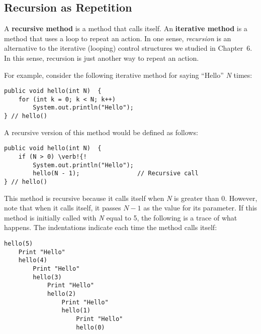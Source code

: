 \subsection{Recursion as Repetition}
\noindent A {\bf recursive method} is a method that calls itself.  An {\bf
iterative method} is a method that uses a loop to repeat an action.  In
one sense, {\it recursion} is an alternative to the iterative
(looping) control structures we studied in
Chapter~6.  In this sense, recursion is just another
way to repeat an action.

For example, consider the following iterative method for
saying ``Hello'' {\it N} times:

\begin{jjjlisting}
\begin{lstlisting}
public void hello(int N)  {
    for (int k = 0; k < N; k++)
        System.out.println("Hello");
} // hello()
\end{lstlisting}
\end{jjjlisting}

\noindent A recursive version of this method would be defined
as follows:

\begin{jjjlisting}
\begin{lstlisting}
public void hello(int N)  {
    if (N > 0) \verb!{!
        System.out.println("Hello");
        hello(N - 1);                // Recursive call
} // hello()
\end{lstlisting}
\end{jjjlisting}

\noindent This method is recursive because it calls itself when {\it
N} is greater than 0. However, note that when it calls itself, it
passes $N-1$ as the value for its parameter.  If this method is
initially called with {\it N} equal to 5, the following is a trace of
what happens.  The indentations indicate each time the method calls
itself:

\begin{jjjlisting}
\begin{lstlisting}
hello(5)
    Print "Hello"
    hello(4)
        Print "Hello"
        hello(3)
            Print "Hello"
            hello(2)
                Print "Hello"
                hello(1)
                    Print "Hello"
                    hello(0)
\end{lstlisting}
\end{jjjlisting}

